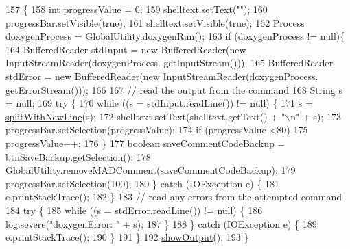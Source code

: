 \begin{DoxyCode}
157                               \{
158         \textcolor{keywordtype}{int} progressValue = 0;
159         shelltext.setText(\textcolor{stringliteral}{""});
160         progressBar.setVisible(\textcolor{keyword}{true});
161         shelltext.setVisible(\textcolor{keyword}{true});
162         Process doxygenProcess = GlobalUtility.doxygenRun();
163         \textcolor{keywordflow}{if} (doxygenProcess != null)\{
164             BufferedReader stdInput = \textcolor{keyword}{new} BufferedReader(\textcolor{keyword}{new} InputStreamReader(doxygenProcess.
      getInputStream()));
165             BufferedReader stdError = \textcolor{keyword}{new} BufferedReader(\textcolor{keyword}{new} InputStreamReader(doxygenProcess.
      getErrorStream()));
166 
167             \textcolor{comment}{// read the output from the command}
168             String s = null;
169             \textcolor{keywordflow}{try} \{
170                 \textcolor{keywordflow}{while} ((s = stdInput.readLine()) != null) \{
171                     s = \hyperlink{classit_1_1isislab_1_1masonassisteddocumentation_1_1mason_1_1wizards_1_1_q___end_wizard_a89adac239da36e67abac1ec9c416bba4}{splitWithNewLine}(s);
172                     shelltext.setText(shelltext.getText() + \textcolor{stringliteral}{"\(\backslash\)n"} + s);
173                     progressBar.setSelection(progressValue);
174                     \textcolor{keywordflow}{if} (progressValue <80)
175                         progressValue++;
176                 \}
177                 \textcolor{keywordtype}{boolean} saveCommentCodeBackup = btnSaveBackup.getSelection();
178                 GlobalUtility.removeMADComment(saveCommentCodeBackup);
179                 progressBar.setSelection(100);
180             \} \textcolor{keywordflow}{catch} (IOException e) \{
181                 e.printStackTrace();
182             \}
183             \textcolor{comment}{// read any errors from the attempted command}
184             \textcolor{keywordflow}{try} \{
185                 \textcolor{keywordflow}{while} ((s = stdError.readLine()) != null) \{                 
186                     log.severe(\textcolor{stringliteral}{"doxygenError: "} + s);
187                 \}
188             \} \textcolor{keywordflow}{catch} (IOException e) \{
189                 e.printStackTrace();
190             \}
191         \}
192         \hyperlink{classit_1_1isislab_1_1masonassisteddocumentation_1_1mason_1_1wizards_1_1_q___end_wizard_a4564b1098ec942795cbd022ccbe338e0}{showOutput}();
193     \}
\end{DoxyCode}


